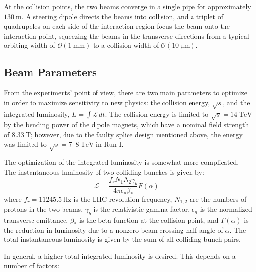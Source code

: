At the collision points, the two beams converge in a single pipe for approximately $\SI{130}{\meter}$. A steering dipole directs the beams into collision, and a triplet of quadrupoles on each side of the interaction region focus the beam onto the interaction point, squeezing the beams in the transverse directions from a typical orbiting width of $\mathcal{O}(\SI{1}{\milli\meter})$ to a collision width of $\mathcal{O}(\SI{10}{\micro\meter})$. 


\subsection{Beam Parameters}
From the experiments' point of view, there are two main parameters to optimize in order to maximize sensitivity to new physics: the collision energy, $\sqrt{s}$, and the integrated luminosity, $L=\int \mathcal{L}\, dt$. The collision energy is limited to $\sqrt{s}=\SI{14}{\tera\electronvolt}$ by the bending power of the dipole magnets, which have a nominal field strength of $\SI{8.33}{\tesla}$; however, due to the faulty splice design mentioned above, the energy was limited to $\sqrt{s}=7$--$\SI{8}{\tera\electronvolt}$ in Run I. 

The optimization of the integrated luminosity is somewhat more complicated. The instantaneous luminosity of two colliding bunches is given by:
\begin{equation}\label{eqn:lumi}
	\mathcal{L} = \frac{f_r N_1 N_2 \gamma_b}{4\pi \epsilon_n \beta_{*}} F(\alpha),
\end{equation}
where $f_r=\SI{11245.5}{\hertz}$ is the LHC revolution frequency, $N_{1,2}$ are the numbers of protons in the two beams, $\gamma_b$ is the relativistic gamma factor, $\epsilon_n$ is the normalized transverse emittance, $\beta_{*}$ is the beta function at the collision point, and $F(\alpha)$ is the reduction in luminosity due to a nonzero beam crossing half-angle of $\alpha$. The total instantaneous luminosity is given by the sum of all colliding bunch pairs. 


In general, a higher total integrated luminosity is desired. This depends on a number of factors:

